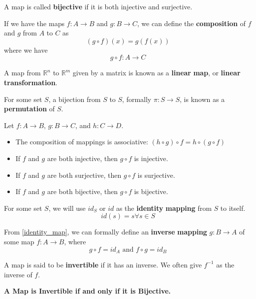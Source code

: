 \documentclass[12pt, letterpaper]{report}
\begin{document}
\begin{definition}[Bijective]\label{bijective}
	A map is called \textbf{bijective} if it is both injective and surjective.
\end{definition}
\begin{definition}
	If we have the maps \(f:A\to B\) and \(g:B\to C\), we can define the \textbf{composition} of \(f\) and \(g\) from \(A\) to \(C\) as 
	\[
		(g\circ f)(x)=g(f(x))
	\]
	where we have
	\[
		g\circ f:A\to C
	\]
\end{definition}
A map from \(\mathbb{R} ^n\) to \(\mathbb{R} ^m\) given by a matrix is known as a \textbf{linear} \textbf{map}, or \textbf{linear} \textbf{transformation}.
\begin{definition}[Permutation]\label{permutation}
	For some set \(S\), a bijection from \(S\) to \(S\), formally \(\pi:S\to S\), is known as a \textbf{permutation} of \(S\).
\end{definition}
\begin{theorem}\label{propcomp}
Let \(f:A\to B\), \(g:B\to C\), and \(h:C\to D\). 
\begin{itemize}
	\item The composition of mappings is associative: \((h\circ g)\circ f=h\circ (g\circ f)\)
	\item If \(f\) and \(g\) are both injective, then \(g\circ f\) is injective.
	\item If \(f\) and \(g\) are both surjective, then \(g\circ f\) is surjective. 
	\item If \(f\) and \(g\) are both bijective, then \(g\circ f\) is bijective.
\end{itemize}
\end{theorem}
\begin{definition}\label{identity_map}
	For some set \(S\), we will use \(id_S\) or \(id\) as the \textbf{identity} \textbf{mapping} from \(S\) to itself.
	\[
		id(s)=s\forall s\in S
	\]
\end{definition}
\begin{definition}\label{invmap}
	From \ref{identity_map}, we can formally define an \textbf{inverse} \textbf{mapping} \(g:B\to A\) of some map \(f:A\to B\), where
	\[g\circ f=id_A \text{ and } f\circ g=id_B\]
\end{definition}
A map is said to be \textbf{invertible} if it has an inverse. We often give \(f^{-1} \) as the inverse of \(f\).
\begin{theorem}
	\textbf{A Map is Invertible if and only if it is Bijective.}
\end{theorem}
\end{document}
